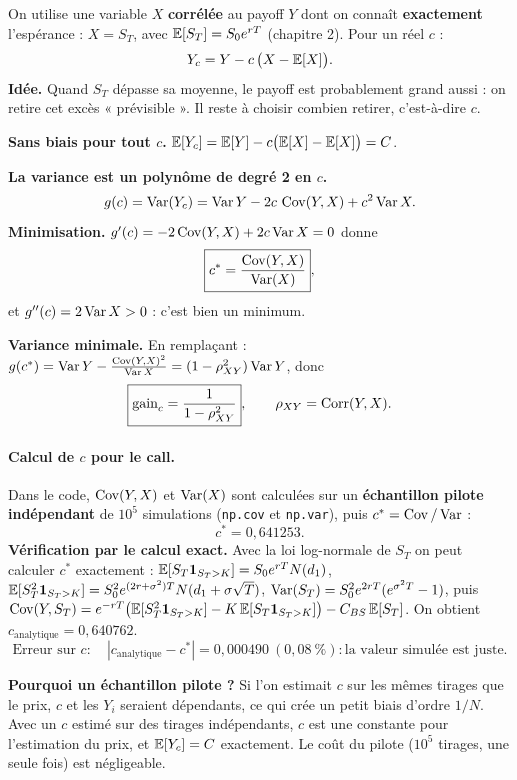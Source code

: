 On utilise une variable $X$ \textbf{corrélée} au payoff $Y$ dont on connaît \textbf{exactement} l'espérance : $X = S_T$, avec $\mathbb{E}[S_T] = S_0e^{rT}$ (chapitre 2). Pour un réel $c$ :
\[
Y_c = Y - c\,\big(X-\mathbb{E}[X]\big).
\]
\textbf{Idée.} Quand $S_T$ dépasse sa moyenne, le payoff est probablement grand aussi : on retire cet excès « prévisible ». Il reste à choisir combien retirer, c'est-à-dire $c$.

\begin{demo}
\textbf{Sans biais pour tout $c$.} $\mathbb{E}[Y_c] = \mathbb{E}[Y] - c\big(\mathbb{E}[X]-\mathbb{E}[X]\big) = C$.

\textbf{La variance est un polynôme de degré 2 en $c$.}
\[
g(c) = \operatorname{Var}(Y_c) = \operatorname{Var} Y - 2c\,\operatorname{Cov}(Y,X) + c^2\operatorname{Var} X.
\]
\textbf{Minimisation.} $g'(c) = -2\operatorname{Cov}(Y,X) + 2c\operatorname{Var} X = 0$ donne
\[
\boxed{c^* = \frac{\operatorname{Cov}(Y,X)}{\operatorname{Var}(X)}},
\]
et $g''(c) = 2\operatorname{Var} X>0$ : c'est bien un minimum.

\textbf{Variance minimale.} En remplaçant : $g(c^*) = \operatorname{Var} Y - \frac{\operatorname{Cov}(Y,X)^2}{\operatorname{Var} X} = (1-\rho_{XY}^2)\operatorname{Var} Y$, donc
\[
\boxed{\text{gain}_{c} = \frac{1}{1-\rho_{XY}^2}},\qquad \rho_{XY} = \operatorname{Corr}(Y,X).
\]
\end{demo}

\paragraph{Calcul de $c$ pour le call.} Dans le code, $\operatorname{Cov}(Y,X)$ et $\operatorname{Var}(X)$ sont calculées sur un \textbf{échantillon pilote indépendant} de $10^5$ simulations (\texttt{np.cov} et \texttt{np.var}), puis $c^* = \operatorname{Cov}/\operatorname{Var}$ :
\[
c^* = 0{,}641253.
\]
\textbf{Vérification par le calcul exact.} Avec la loi log-normale de $S_T$ on peut calculer $c^*$ exactement : $\mathbb{E}[S_T\mathbf{1}_{S_T>K}] = S_0e^{rT}N(d_1)$, $\mathbb{E}[S_T^2\mathbf{1}_{S_T>K}] = S_0^2e^{(2r+\sigma^2)T}N(d_1+\sigma\sqrt T)$, $\operatorname{Var}(S_T) = S_0^2e^{2rT}(e^{\sigma^2T}-1)$, puis $\operatorname{Cov}(Y,S_T) = e^{-rT}\big(\mathbb{E}[S_T^2\mathbf{1}_{S_T>K}] - K\,\mathbb{E}[S_T\mathbf{1}_{S_T>K}]\big) - C_{BS}\,\mathbb{E}[S_T]$. On obtient $c_{\text{analytique}} = 0{,}640762$.
\[
\text{Erreur sur } c :\quad |c_{\text{analytique}} - c^*| = 0{,}000490\ (0{,}08\ \%) : \text{la valeur simulée est juste.}
\]

\textbf{Pourquoi un échantillon pilote ?} Si l'on estimait $c$ sur les mêmes tirages que le prix, $c$ et les $Y_i$ seraient dépendants, ce qui crée un petit biais d'ordre $1/N$. Avec un $c$ estimé sur des tirages indépendants, $c$ est une constante pour l'estimation du prix, et $\mathbb{E}[Y_c] = C$ exactement. Le coût du pilote ($10^5$ tirages, une seule fois) est négligeable.

